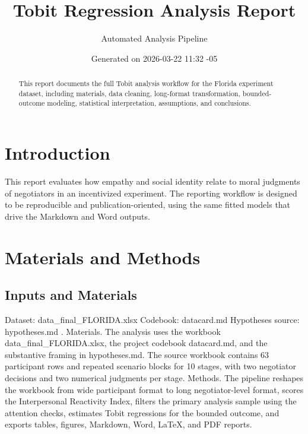 \documentclass[11pt]{article}
\title{Tobit Regression Analysis Report}
\author{Automated Analysis Pipeline}
\date{Generated on 2026-03-22 11:32 -05}
\begin{document}
\maketitle
\begin{abstract}
This report documents the full Tobit analysis workflow for the Florida experiment dataset, including materials, data cleaning, long-format transformation, bounded-outcome modeling, statistical interpretation, assumptions, and conclusions.
\end{abstract}
\section{Introduction}
This report evaluates how empathy and social identity relate to moral judgments of negotiators in an incentivized experiment. The reporting workflow is designed to be reproducible and publication-oriented, using the same fitted models that drive the Markdown and Word outputs.
\section{Materials and Methods}
\subsection{Inputs and Materials}
Dataset: data\_final\_FLORIDA.xlsx Codebook: datacard.md Hypotheses source: hypotheses.md .
Materials. The analysis uses the workbook data\_final\_FLORIDA.xlsx, the project codebook datacard.md, and the substantive framing in hypotheses.md. The source workbook contains 63 participant rows and repeated scenario blocks for 10 stages, with two negotiator decisions and two numerical judgments per stage. Methods. The pipeline reshapes the workbook from wide participant format to long negotiator-level format, scores the Interpersonal Reactivity Index, filters the primary analysis sample using the attention checks, estimates Tobit regressions for the bounded outcome, and exports tables, figures, Markdown, Word, LaTeX, and PDF reports.
\end{document}
